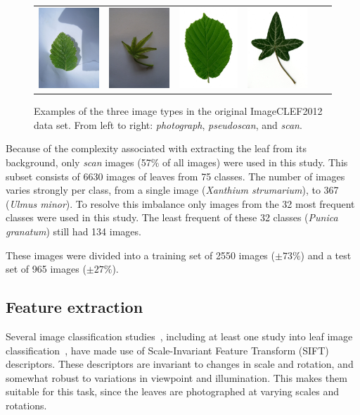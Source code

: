 \begin{figure}[htb]
{\begin{tabular}{c@{\hskip 0.1in}c|c@{\hskip 0.1in}c|c@{\hskip 0.1in}c}
\includegraphics[width = .12\textwidth]{image/5093pseudoscan.jpg} &
\includegraphics[width = .12\textwidth]{image/2655pseudoscan.jpg} &
\includegraphics[width = .12\textwidth]{image/8736scan.jpg} &
\includegraphics[width = .12\textwidth]{image/5292scan.jpg}
\end{tabular}
}
\caption{Examples of the three image types in the original ImageCLEF2012 data set. From left to right: \emph{photograph}, \emph{pseudoscan}, and \emph{scan}.}
\label{fig:imagetypes}
\end{figure}

Because of the complexity associated with extracting the leaf from its background, only \emph{scan} images (57\% of all images) were used in this study.
This subset consists of 6630 images of leaves from 75 classes.
The number of images varies strongly per class, from a single image (\emph{Xanthium strumarium}), to 367 (\emph{Ulmus minor}).
To resolve this imbalance only images from the 32 most frequent classes were used in this study. The least frequent of these 32 classes (\emph{Punica granatum}) still had 134 images.

These images were divided into a training set of 2550 images ($\pm 73\%$) and a test set of 965 images ($\pm 27\%$).


\subsection{Feature extraction}
Several image classification studies~\cite{Wang2015, Lowe1999}, including at least one study into leaf image classification~\cite{Wang2011}, have made use of Scale-Invariant Feature Transform (SIFT) descriptors.
These descriptors are invariant to changes in scale and rotation, and somewhat robust to variations in viewpoint and illumination.
This makes them suitable for this task, since the leaves are photographed at varying scales and rotations.

